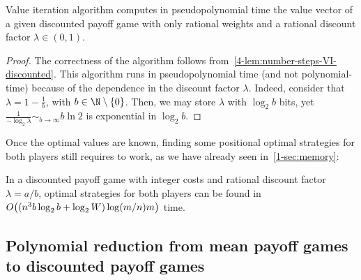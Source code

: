 \begin{theorem}\label{4-thm:DP-value-iteration}
  Value iteration algorithm computes in pseudopolynomial time the
  value vector of a given discounted payoff game with only rational
  weights and a rational discount factor $\lambda\in (0,1)$. 
\end{theorem}
\begin{proof}
  The correctness of the algorithm follows
  from~\cref{4-lem:number-steps-VI-discounted}.  This algorithm runs
  in pseudopolynomial time (and not polynomial-time) because of the
  dependence in the discount factor $\lambda$. Indeed, consider that
  $\lambda = 1-\frac 1 b$, with $b\in \N\setminus \{0\}$. Then, we may
  store $\lambda$ with $\log_2 b$ bits, yet
  $\frac 1{-\log_2\lambda} \sim_{b\to \infty} b\ln 2$ is exponential
  in $\log_2b$.
\end{proof}


Once the optimal values are known, finding some positional optimal
strategies for both players still requires to work, as we have already
seen in~\cref{1-sec:memory}:
\begin{theorem}\label{4-thm:DP-strategies}
  In a discounted payoff game with integer costs and rational discount
  factor $\lambda = a/b$, optimal strategies for both players can be
  found in
  $O\big((n^3b\log_2b + \log_2W)\allowbreak
  \log(m/n) m\big)$ time.
\end{theorem}

\subsection*{Polynomial reduction from mean payoff games to
  discounted payoff games}\label{4-sec:mean_payoff-values}

